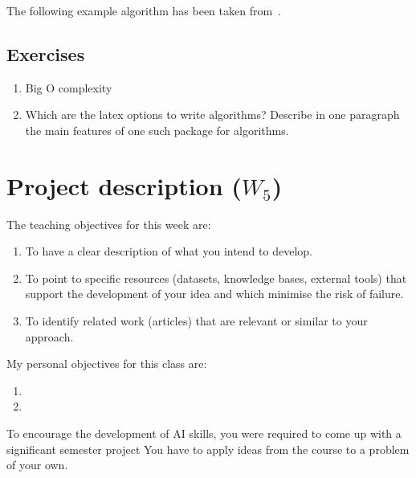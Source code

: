 \documentclass[a4paper,12pt]{report}
\begin{document}
The following example algorithm has been taken from~\cite{7034697}.


\section{Exercises}
\begin{enumerate}
 \item Big O complexity
 \item Which are the latex options to write algorithms? 
 Describe in one paragraph the main features of one such package for algorithms.
\end{enumerate}

\vspace{0.5cm}

\vspace{0.5cm}



\chapter{Project description ($W_5$)}

The teaching objectives for this week are:
\begin{enumerate}
 \item To have a clear description of what you intend to develop.
\item To point to specific resources (datasets, knowledge bases, external tools) 
that support the development of your idea and which minimise the risk of failure.
\item To identify related work (articles) that are relevant or similar to your approach.
\end{enumerate}

\vspace{0.5cm}

My personal objectives for this class are:
\begin{enumerate}
 \item 
 \item 
\end{enumerate}


To encourage the development of AI skills, 
you  were required to come up with a significant semester project 
You have to  apply ideas from the course to a problem of your own.
\end{document}
